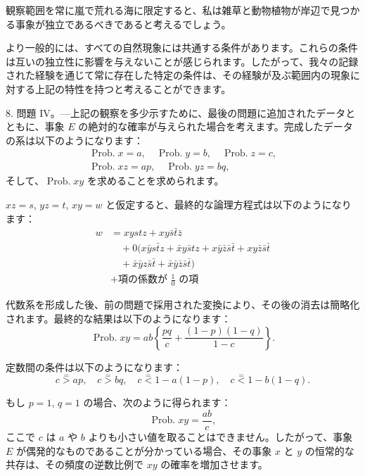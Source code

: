 \documentclass[a4paper,11pt,openany]{ltjsbook}
\begin{document}
観察範囲を常に嵐で荒れる海に限定すると、私は雑草と動物植物が岸辺で見つかる事象が独立であるべきであると考えるでしょう。

より一般的には、すべての自然現象には共通する条件があります。これらの条件は互いの独立性に影響を与えないことが感じられます。したがって、我々の記録された経験を通じて常に存在した特定の条件は、その経験が及ぶ範囲内の現象に対する上記の特性を持つと考えることができます。

8. 問題 IV。---上記の観察を多少示すために、最後の問題に追加されたデータとともに、事象 $E$ の絶対的な確率が与えられた場合を考えます。完成したデータの系は以下のようになります：
\begin{gather*}
\operatorname{Prob. } x = a, \quad \operatorname{Prob. } y = b, \quad \operatorname{Prob. } z = c, \\
\operatorname{Prob. } xz = ap, \quad \operatorname{Prob. } yz = bq,
\end{gather*}
そして、$\operatorname{Prob. } xy$ を求めることを求められます。

$xz = s$, $yz = t$, $xy = w$ と仮定すると、最終的な論理方程式は以下のようになります：
\begin{equation*}
\begin{split}
w &= xystz + xy\bar{s}\bar{t}\bar{z} \\
& \quad + 0(x\bar{y}s\bar{t}z + \bar{x}y\bar{s}tz
+ x\bar{y}\bar{z}\bar{s}\bar{t} + xy\bar{z}\bar{s}\bar{t}
\\ & \quad
+ \bar{x}\bar{y}z\bar{s}\bar{t} + \bar{x}\bar{y}\bar{z}\bar{s}\bar{t})
\\
&+ \text{項の係数が } \frac{1}{0} \text{ の項}  %
\end{split}
\end{equation*}

代数系を形成した後、前の問題で採用された変換により、その後の消去は簡略化されます。最終的な結果は以下のようになります：
\begin{equation*}
\operatorname{Prob. } xy = ab \left\{ \frac{pq}{c} + \frac{(1-p)(1-q)}{1-c} \right\}.  \tag{2}
\end{equation*}

定数間の条件は以下のようになります：
\begin{equation*}
c \stackrel{=}{>} ap, \quad
c \stackrel{=}{>} bq, \quad
c \stackrel{=}{<} 1 - a(1 - p), \quad
c \stackrel{=}{<} 1-b(1-q).
\end{equation*}

もし $p = 1$, $q = 1$ の場合、次のように得られます：
\begin{equation*}
\operatorname{Prob.} xy = \frac{ab}{c},
\end{equation*}
ここで $c$ は $a$ や $b$ よりも小さい値を取ることはできません。したがって、事象 $E$ が偶発的なものであることが分かっている場合、その事象 $x$ と $y$ の恒常的な共存は、その頻度の逆数比例で $xy$ の確率を増加させます。
\end{document}
